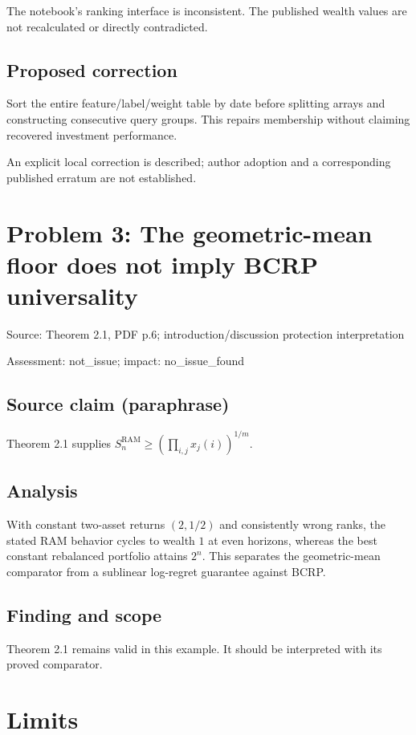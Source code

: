 \documentclass[11pt]{article}
\begin{document}
The notebook’s ranking interface is inconsistent. The published wealth values are not recalculated or directly contradicted.

\subsection*{Proposed correction}

Sort the entire feature/label/weight table by date before splitting arrays and constructing consecutive query groups. This repairs membership without claiming recovered investment performance.

An explicit local correction is described; author adoption and a corresponding published erratum are not established.

\section*{Problem 3: The geometric-mean floor does not imply BCRP universality}

Source: Theorem 2.1, PDF p.6; introduction/discussion protection interpretation

Assessment: not\_issue; impact: no\_issue\_found

\subsection*{Source claim (paraphrase)}

Theorem 2.1 supplies \(S_n^{\mathrm{RAM}}\geq(\prod_{i,j}x_j(i))^{1/m}\).

\subsection*{Analysis}

With constant two-asset returns \((2,1/2)\) and consistently wrong ranks, the stated RAM behavior cycles to wealth \(1\) at even horizons, whereas the best constant rebalanced portfolio attains \(2^n\). This separates the geometric-mean comparator from a sublinear log-regret guarantee against BCRP.

\subsection*{Finding and scope}

Theorem 2.1 remains valid in this example. It should be interpreted with its proved comparator.

\section*{Limits}
\end{document}
